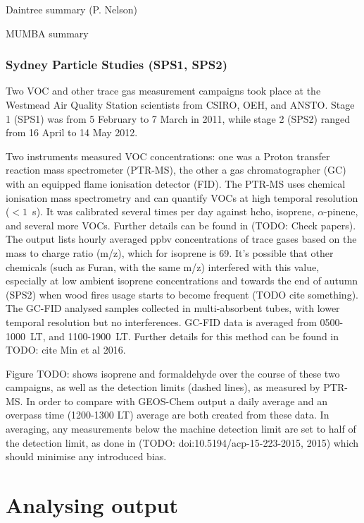   Daintree summary (P. Nelson)
  
  MUMBA summary
  
  \subsubsection{Sydney Particle Studies (SPS1, SPS2)}
  Two VOC and other trace gas measurement campaigns took place at the Westmead Air Quality Station scientists from CSIRO, OEH, and ANSTO. 
  Stage 1 (SPS1) was from 5 February to 7 March in 2011, while stage 2 (SPS2) ranged from 16 April to 14 May 2012.
  
  Two instruments measured VOC concentrations: one was a Proton transfer reaction mass spectrometer (PTR-MS), the other a gas chromatographer (GC) with an equipped flame ionisation detector (FID).
  The PTR-MS uses chemical ionisation mass spectrometry and can quantify VOCs at high temporal resolution ($< 1$~s).
  It was calibrated several times per day against hcho, isoprene, $\alpha$-pinene, and several more VOCs. Further details can be found in \cite{Dunne2012,Dunne2017} (TODO: Check papers).
  The output lists hourly averaged ppbv concentrations of trace gases based on the mass to charge ratio (m/z), which for isoprene is 69.
  It's possible that other chemicals (such as Furan, with the same m/z) interfered with this value, especially at low ambient isoprene concentrations and towards the end of autumn (SPS2) when wood fires usage starts to become frequent (TODO cite something).
  The GC-FID analysed samples collected in multi-absorbent tubes, with lower temporal resolution but no interferences. GC-FID data is averaged from 0500-1000~LT, and 1100-1900~LT. Further details for this method can be found in TODO: cite Min et al 2016.
  
  Figure TODO: shows isoprene and formaldehyde over the course of these two campaigns, as well as the detection limits (dashed lines), as measured by PTR-MS. In order to compare with GEOS-Chem output a daily average and an overpass time (1200-1300 LT) average are both created from these data.
  In averaging, any measurements below the machine detection limit are set to half of the detection limit, as done in (TODO: doi:10.5194/acp-15-223-2015, 2015) which should minimise any introduced bias.

\section{Analysing output}
\label{Model:Analysis}

